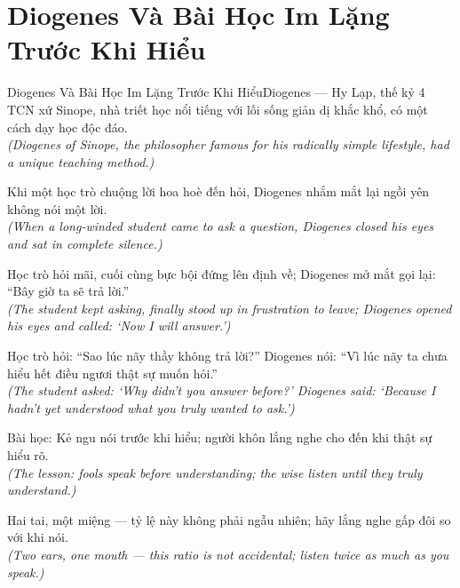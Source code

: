 \section{Diogenes Và Bài Học Im Lặng Trước Khi Hiểu}
\begin{truyen}{Diogenes Và Bài Học Im Lặng Trước Khi Hiểu}{Diogenes --- Hy Lạp, thế kỷ 4 TCN}
 xứ Sinope, nhà triết học nổi tiếng với lối sống giản dị khắc khổ, có một cách dạy học độc đáo.\\[4pt]
\textit{(Diogenes of Sinope, the philosopher famous for his radically simple lifestyle, had a unique teaching method.)}

Khi một học trò chuộng lời hoa hoè đến hỏi, Diogenes nhắm mắt lại ngồi yên không nói một lời.\\[4pt]
\textit{(When a long-winded student came to ask a question, Diogenes closed his eyes and sat in complete silence.)}

Học trò hỏi mãi, cuối cùng bực bội đứng lên định về; Diogenes mở mắt gọi lại: ``Bây giờ ta sẽ trả lời.''\\[4pt]
\textit{(The student kept asking, finally stood up in frustration to leave; Diogenes opened his eyes and called: `Now I will answer.')}

Học trò hỏi: ``Sao lúc nãy thầy không trả lời?'' Diogenes nói: ``Vì lúc nãy ta chưa hiểu hết điều ngươi thật sự muốn hỏi.''\\[4pt]
\textit{(The student asked: `Why didn't you answer before?' Diogenes said: `Because I hadn't yet understood what you truly wanted to ask.')}

Bài học: Kẻ ngu nói trước khi hiểu; người khôn lắng nghe cho đến khi thật sự hiểu rõ.\\[4pt]
\textit{(The lesson: fools speak before understanding; the wise listen until they truly understand.)}

\end{truyen}
\begin{baihoc}
  Hai tai, một miệng --- tỷ lệ này không phải ngẫu nhiên; hãy lắng nghe gấp đôi so với khi nói.\\[4pt]
  \textit{(Two ears, one mouth --- this ratio is not accidental; listen twice as much as you speak.)}
\end{baihoc}

